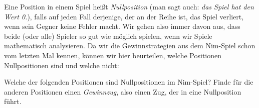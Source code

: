 \documentclass{zusammenfassung}
\begin{document}

Eine Position in einem Spiel heißt \emph{Nullposition} (man sagt auch: \emph{das Spiel hat den Wert 0.}), falls auf jeden Fall
derjenige, der an der Reihe ist, das Spiel verliert, wenn sein Gegner keine Fehler macht. Wir gehen also immer davon aus, dass
beide (oder alle) Spieler so gut wie möglich spielen, wenn wir Spiele mathematisch analysieren. Da wir die Gewinnstrategien aus
dem Nim-Spiel schon vom letzten Mal kennen, können wir hier beurteilen, welche Positionen Nullpositionen sind und welche nicht:

\def\line{{\draw (0,-0.1)--(0,0.3);}}
\begin{aufgabe}
  Welche der folgenden Positionen sind Nullpositionen im Nim-Spiel? Finde für die anderen Positionen einen \emph{Gewinnzug}, also
  einen Zug, der in eine Nullposition führt.

  \begin{center}
\end{center}
\end{aufgabe}
\end{document}
